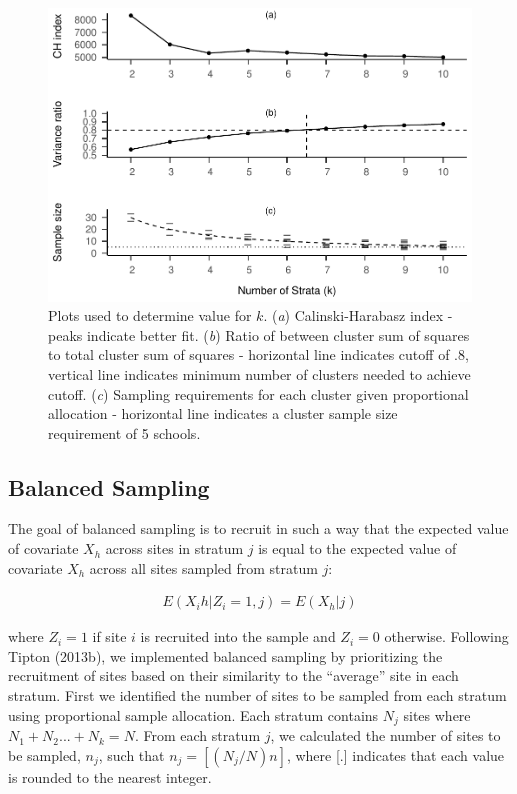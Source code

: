 \documentclass[man,floatsintext]{apa6}
\begin{document}
\begin{figure}
\centering
\includegraphics{GenSamp-Paper_files/figure-latex/fig-k-plots-1.pdf}
\caption{\label{fig:fig-k-plots}Plots used to determine value for \(k\). (\emph{a}) Calinski-Harabasz index - peaks indicate better fit. (\emph{b}) Ratio of between cluster sum of squares to total cluster sum of squares - horizontal line indicates cutoff of .8, vertical line indicates minimum number of clusters needed to achieve cutoff. (\emph{c}) Sampling requirements for each cluster given proportional allocation - horizontal line indicates a cluster sample size requirement of 5 schools.}
\end{figure}

\hypertarget{balanced-sampling}{%
\subsection{Balanced Sampling}\label{balanced-sampling}}

The goal of balanced sampling is to recruit in such a way that the expected value of covariate \(X_h\) across sites in stratum \(j\) is equal to the expected value of covariate \(X_h\) across all sites sampled from stratum \(j\):

\begin{align}
  E(X_ih|Z_i = 1, j) = E(X_h|j)
\end{align}

where \(Z_i = 1\) if site \(i\) is recruited into the sample and \(Z_i = 0\) otherwise. Following Tipton (2013b), we implemented balanced sampling by prioritizing the recruitment of sites based on their similarity to the \enquote{average} site in each stratum. First we identified the number of sites to be sampled from each stratum using proportional sample allocation. Each stratum contains \(N_j\) sites where \(N_1 + N_2 ... + N_k = N\). From each stratum \(j\), we calculated the number of sites to be sampled, \(n_j\), such that \(n_j = [(N_j/N)n]\), where {[}.{]} indicates that each value is rounded to the nearest integer.
\end{document}
